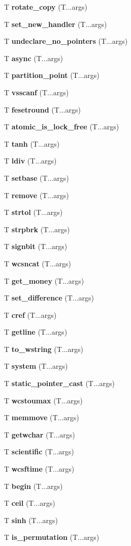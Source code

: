 \begin{DoxyCompactItemize}
\item 
T {\bf rotate\+\_\+copy} (T...\+args)
\item 
T {\bf set\+\_\+new\+\_\+handler} (T...\+args)
\item 
T {\bf undeclare\+\_\+no\+\_\+pointers} (T...\+args)
\item 
T {\bf async} (T...\+args)
\item 
T {\bf partition\+\_\+point} (T...\+args)
\item 
T {\bf vsscanf} (T...\+args)
\item 
T {\bf fesetround} (T...\+args)
\item 
T {\bf atomic\+\_\+is\+\_\+lock\+\_\+free} (T...\+args)
\item 
T {\bf tanh} (T...\+args)
\item 
T {\bf ldiv} (T...\+args)
\item 
T {\bf setbase} (T...\+args)
\item 
T {\bf remove} (T...\+args)
\item 
T {\bf strtol} (T...\+args)
\item 
T {\bf strpbrk} (T...\+args)
\item 
T {\bf signbit} (T...\+args)
\item 
T {\bf wcsncat} (T...\+args)
\item 
T {\bf get\+\_\+money} (T...\+args)
\item 
T {\bf set\+\_\+difference} (T...\+args)
\item 
T {\bf cref} (T...\+args)
\item 
T {\bf getline} (T...\+args)
\item 
T {\bf to\+\_\+wstring} (T...\+args)
\item 
T {\bf system} (T...\+args)
\item 
T {\bf static\+\_\+pointer\+\_\+cast} (T...\+args)
\item 
T {\bf wcstoumax} (T...\+args)
\item 
T {\bf memmove} (T...\+args)
\item 
T {\bf getwchar} (T...\+args)
\item 
T {\bf scientific} (T...\+args)
\item 
T {\bf wcsftime} (T...\+args)
\item 
T {\bf begin} (T...\+args)
\item 
T {\bf ceil} (T...\+args)
\item 
T {\bf sinh} (T...\+args)
\item 
T {\bf is\+\_\+permutation} (T...\+args)
\item 

\end{DoxyCompactItemize}

